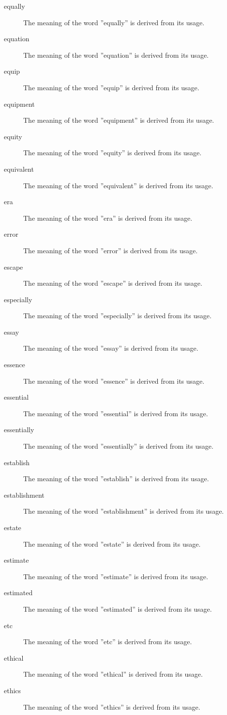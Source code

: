 \documentclass[12pt, letterpaper]{memoir}
\begin{document}
\begin{description}
\item[equally] The meaning of the word ''equally'' is derived from its usage.
\item[equation] The meaning of the word ''equation'' is derived from its usage.
\item[equip] The meaning of the word ''equip'' is derived from its usage.
\item[equipment] The meaning of the word ''equipment'' is derived from its usage.
\item[equity] The meaning of the word ''equity'' is derived from its usage.
\item[equivalent] The meaning of the word ''equivalent'' is derived from its usage.
\item[era] The meaning of the word ''era'' is derived from its usage.
\item[error] The meaning of the word ''error'' is derived from its usage.
\item[escape] The meaning of the word ''escape'' is derived from its usage.
\item[especially] The meaning of the word ''especially'' is derived from its usage.
\item[essay] The meaning of the word ''essay'' is derived from its usage.
\item[essence] The meaning of the word ''essence'' is derived from its usage.
\item[essential] The meaning of the word ''essential'' is derived from its usage.
\item[essentially] The meaning of the word ''essentially'' is derived from its usage.
\item[establish] The meaning of the word ''establish'' is derived from its usage.
\item[establishment] The meaning of the word ''establishment'' is derived from its usage.
\item[estate] The meaning of the word ''estate'' is derived from its usage.
\item[estimate] The meaning of the word ''estimate'' is derived from its usage.
\item[estimated] The meaning of the word ''estimated'' is derived from its usage.
\item[etc] The meaning of the word ''etc'' is derived from its usage.
\item[ethical] The meaning of the word ''ethical'' is derived from its usage.
\item[ethics] The meaning of the word ''ethics'' is derived from its usage.

\end{description}
\end{document}
